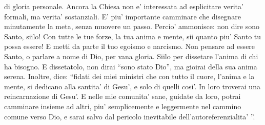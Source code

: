 di gloria personale.
Ancora la Chiesa non e' interessata ad esplicitare
verita' formali, ma verita' sostanziali.
E' piu' importante camminare che disegnare 
minutamente la meta, senza muovere un passo.
Percio' ammonisce: non dire sono Santo, siilo! 
Con tutte le tue forze, la tua anima e mente, sii 
quanto piu' Santo tu possa essere! E metti
da parte il tuo egoismo e narcismo.
Non pensare ad essere Santo, o parlare a nome di Dio,
per vana gloria. Siilo per dissetare l'anima 
di chi ha bisogno. E dissetatolo, 
non dirai ``sono stato Dio'', ma 
gioirai della sua anima serena.
Inoltre, dice: ``fidati dei miei ministri che con tutto
il cuore, l'anima e la mente, si dedicano alla santita'
di Gesu', e solo di quelli cosi'.
In loro troverai una reincarnazione di Gesu'.
E nelle mie comunita' sane, guidate da loro, potrai 
camminare insieme ad altri, piu' semplicemente e
leggermente nel cammino comune verso Dio, 
e sarai salvo dal pericolo inevitabile
dell'autoreferenzialita' ''.
